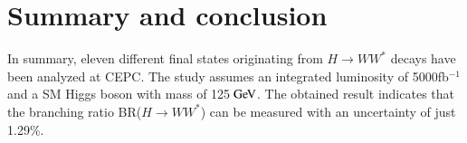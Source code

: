 \documentclass[11pt,a4paper]{cepcnote}
\begin{document}
%
%
%

%
%
\section{Summary and conclusion}
In summary, eleven different final states originating from 
$H\rightarrow WW^*$ decays have been analyzed at CEPC. The study assumes 
an integrated luminosity of 5000fb$^{-1}$ and a SM Higgs boson with mass 
of 125$\gev$. The obtained result indicates that the branching ratio 
BR($H\rightarrow WW^*$) can be measured with an uncertainty of just 1.29\%.
\end{document}
